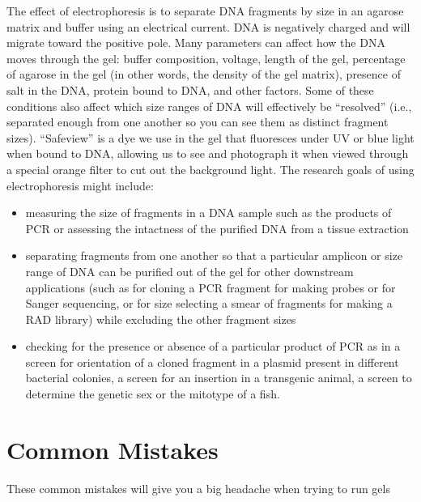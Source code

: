 \documentclass[
  letterpaper,
  DIV=11,
  numbers=noendperiod]{scrreprt}
\providecommand{\tightlist}{%
  \setlength{\itemsep}{0pt}\setlength{\parskip}{0pt}}\usepackage{longtable,booktabs,array}
\begin{document}
The effect of electrophoresis is to separate DNA fragments by size in an
agarose matrix and buffer using an electrical current. DNA is negatively
charged and will migrate toward the positive pole. Many parameters can
affect how the DNA moves through the gel: buffer composition, voltage,
length of the gel, percentage of agarose in the gel (in other words, the
density of the gel matrix), presence of salt in the DNA, protein bound
to DNA, and other factors. Some of these conditions also affect which
size ranges of DNA will effectively be ``resolved'' (i.e., separated
enough from one another so you can see them as distinct fragment sizes).
``Safeview'' is a dye we use in the gel that fluoresces under UV or blue
light when bound to DNA, allowing us to see and photograph it when
viewed through a special orange filter to cut out the background light.
The research goals of using electrophoresis might include:

\begin{itemize}
\tightlist
\item
  measuring the size of fragments in a DNA sample such as the products
  of PCR or assessing the intactness of the purified DNA from a tissue
  extraction
\item
  separating fragments from one another so that a particular amplicon or
  size range of DNA can be purified out of the gel for other downstream
  applications (such as for cloning a PCR fragment for making probes or
  for Sanger sequencing, or for size selecting a smear of fragments for
  making a RAD library) while excluding the other fragment sizes
\item
  checking for the presence or absence of a particular product of PCR as
  in a screen for orientation of a cloned fragment in a plasmid present
  in different bacterial colonies, a screen for an insertion in a
  transgenic animal, a screen to determine the genetic sex or the
  mitotype of a fish.
\end{itemize}

\hypertarget{common-mistakes}{%
\section{Common Mistakes}\label{common-mistakes}}

\begin{tcolorbox}[enhanced jigsaw, rightrule=.15mm, title=\textcolor{quarto-callout-warning-color}{\faExclamationTriangle}\hspace{0.5em}{Warning}, titlerule=0mm, opacitybacktitle=0.6, toprule=.15mm, bottomrule=.15mm, opacityback=0, left=2mm, colframe=quarto-callout-warning-color-frame, breakable, coltitle=black, colback=white, colbacktitle=quarto-callout-warning-color!10!white, bottomtitle=1mm, leftrule=.75mm, toptitle=1mm, arc=.35mm]

These common mistakes will give you a big headache when trying to run
gels

\end{tcolorbox}
\end{document}
